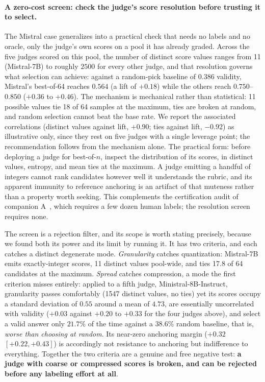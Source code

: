 \documentclass[11pt]{article}
\begin{document}
\paragraph{A zero-cost screen: check the judge's score resolution before trusting it to select.}
The Mistral case generalizes into a practical check that needs no labels and no oracle, only the judge's own scores on a pool it has already graded.
Across the five judges scored on this pool, the number of distinct score values ranges from 11 (Mistral-7B) to roughly $2500$ for every other judge, and that resolution governs what selection can achieve: against a random-pick baseline of $0.386$ validity, Mistral's best-of-64 reaches $0.564$ (a lift of $+0.18$) while the others reach $0.750$--$0.850$ ($+0.36$ to $+0.46$).
The mechanism is mechanical rather than statistical: 11 possible values tie 18 of 64 samples at the maximum, ties are broken at random, and random selection cannot beat the base rate.
We report the associated correlations (distinct values against lift, $+0.90$; ties against lift, $-0.92$) as illustrative only, since they rest on five judges with a single leverage point; the recommendation follows from the mechanism alone.
The practical form: before deploying a judge for best-of-$n$, inspect the distribution of its scores, in distinct values, entropy, and mean ties at the maximum.
A judge emitting a handful of integers cannot rank candidates however well it understands the rubric, and its apparent immunity to reference anchoring is an artifact of that muteness rather than a property worth seeking.
This complements the certification audit of companion A~\cite{companionA}, which requires a few dozen human labels; the resolution screen requires none.

The screen is a rejection filter, and its scope is worth stating precisely, because we found both its power and its limit by running it.
It has two criteria, and each catches a distinct degenerate mode.
\emph{Granularity} catches quantization: Mistral-7B emits exactly-integer scores, 11 distinct values pool-wide, and ties 17.8 of 64 candidates at the maximum.
\emph{Spread} catches compression, a mode the first criterion misses entirely: applied to a fifth judge, Ministral-8B-Instruct, granularity passes comfortably (1547 distinct values, no ties) yet its scores occupy a standard deviation of $0.55$ around a mean of $4.73$, are essentially uncorrelated with validity ($+0.03$ against $+0.20$ to $+0.33$ for the four judges above), and select a valid answer only $21.7\%$ of the time against a $38.6\%$ random baseline, that is, \emph{worse than choosing at random}.
Its near-zero anchoring margin ($+0.32$ $[+0.22, +0.43]$) is accordingly not resistance to anchoring but indifference to everything.
Together the two criteria are a genuine and free negative test: \textbf{a judge with coarse or compressed scores is broken, and can be rejected before any labeling effort at all}.
\end{document}
